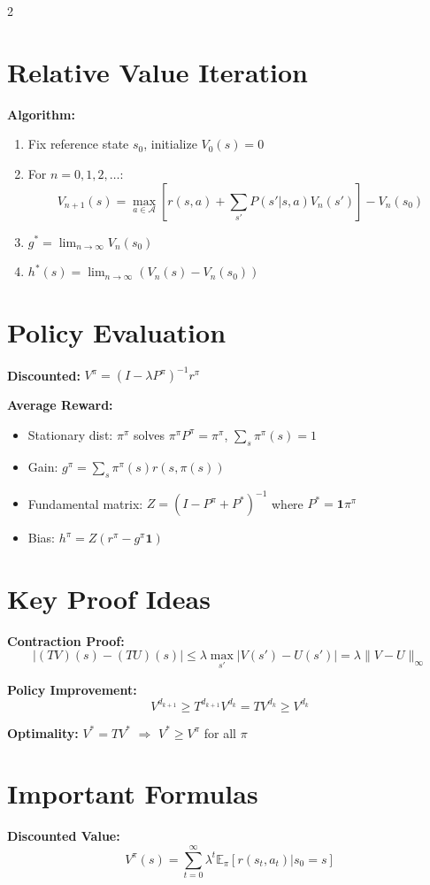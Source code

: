 \documentclass[8pt]{extarticle}
\begin{document}
\begin{multicols}{2}
\section*{\textcolor{algorithmgreen}{Relative Value Iteration}}
\textbf{Algorithm:}
\begin{enumerate}[leftmargin=*]
    \item Fix reference state $s_0$, initialize $V_0(s) = 0$
    \item For $n = 0, 1, 2, \ldots$:
    $$V_{n+1}(s) = \max_{a \in \mathcal{A}} \left[r(s,a) + \sum_{s'} P(s'|s,a) V_n(s')\right] - V_n(s_0)$$
    \item $g^* = \lim_{n \to \infty} V_n(s_0)$
    \item $h^*(s) = \lim_{n \to \infty} (V_n(s) - V_n(s_0))$
\end{enumerate}

\section*{\textcolor{theoremblue}{Policy Evaluation}}
\textbf{Discounted:} $V^\pi = (I - \lambda P^\pi)^{-1} r^\pi$

\textbf{Average Reward:}
\begin{itemize}[leftmargin=*]
    \item Stationary dist: $\pi^\pi$ solves $\pi^\pi P^\pi = \pi^\pi$, $\sum_s \pi^\pi(s) = 1$
    \item Gain: $g^\pi = \sum_s \pi^\pi(s) r(s, \pi(s))$
    \item Fundamental matrix: $Z = (I - P^\pi + P^*)^{-1}$ where $P^* = \mathbf{1} \pi^\pi$
    \item Bias: $h^\pi = Z(r^\pi - g^\pi \mathbf{1})$
\end{itemize}

\section*{\textcolor{proofpurple}{Key Proof Ideas}}
\textbf{Contraction Proof:}
$$|(TV)(s) - (TU)(s)| \leq \lambda \max_{s'} |V(s') - U(s')| = \lambda \|V - U\|_\infty$$

\textbf{Policy Improvement:}
$$V^{d_{k+1}} \geq T^{d_{k+1}} V^{d_k} = TV^{d_k} \geq V^{d_k}$$

\textbf{Optimality:} $V^* = TV^*$ $\Rightarrow$ $V^* \geq V^\pi$ for all $\pi$

\section*{\textcolor{formulared}{Important Formulas}}
\textbf{Discounted Value:}
$$V^\pi(s) = \sum_{t=0}^\infty \lambda^t \mathbb{E}_\pi[r(s_t, a_t) | s_0 = s]$$


\end{multicols}
\end{document}
